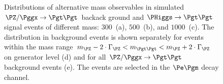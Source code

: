 {{{{\begin{figure}
\begin{center}
\end{center}
\caption{
  Distributions of alternative mass observables in simulated $\PZ/\Pggx \to \Pgt\Pgt$ backack ground
  and $\PHiggs \to \Pgt\Pgt$ signal events of different mass:
  $300$~\GeV (a), $500$~\GeV (b), and $1000$~\GeV (c).
  The distribution in background events is shown separately for events within the
  mass range $m_{\PZ} - 2 \cdot \Gamma_{\PZ} < m_{\Pgt\Pgt} < m_{\PZ} + 2 \cdot \Gamma_{\PZ}$ on generator level (d)
  and for all $\PZ/\Pggx \to \Pgt\Pgt$ background events (e).
  The events are selected in the $\Pe\Pgm$ decay channel.
}
\label{fig:massDistributions_mssm_emu}
\end{figure}


}}}}
